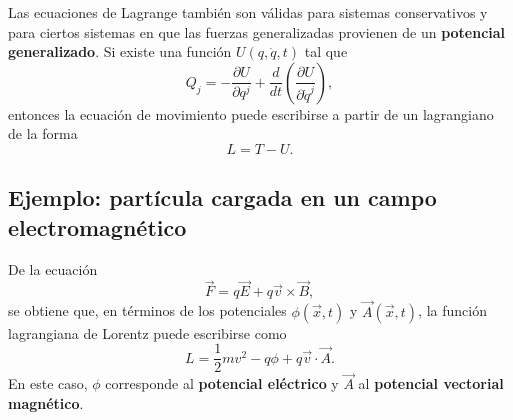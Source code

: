 \documentclass[../apunte_mecanica_clasica.tex]{subfiles}%
\begin{document}
Las ecuaciones de Lagrange también son válidas para sistemas conservativos y para ciertos sistemas en que las fuerzas generalizadas provienen de un \textbf{potencial generalizado}. Si existe una función $U(q,\dot q,t)$ tal que
\begin{equation}
    Q_j=-\frac{\partial U}{\partial q^j}
    +\frac{d}{dt}\left(\frac{\partial U}{\partial \dot q^j}\right),
    \label{eq:mr-potencial-generalizado}
\end{equation}
entonces la ecuación de movimiento puede escribirse a partir de un lagrangiano de la forma
\begin{equation}
    L=T-U.
    \label{eq:mr-lagrangiano-potencial-generalizado}
\end{equation}

\subsection{Ejemplo: partícula cargada en un campo electromagnético}
\label{subsec:mr-ejemplo-electromagnetico}

De la ecuación
\begin{equation}
    \vec F=q\vec E+q\vec v\times \vec B,
    \label{eq:mr-fuerza-lorentz}
\end{equation}
se obtiene que, en términos de los potenciales $\phi(\vec x,t)$ y $\vec A(\vec x,t)$, la función lagrangiana de Lorentz puede escribirse como
\begin{equation}
    L=\frac{1}{2}m v^2-q\phi+q\vec v\cdot\vec A.
    \label{eq:mr-lagrangiano-lorentz}
\end{equation}
En este caso, $\phi$ corresponde al \textbf{potencial eléctrico} y $\vec A$ al \textbf{potencial vectorial magnético}.
\end{document}
